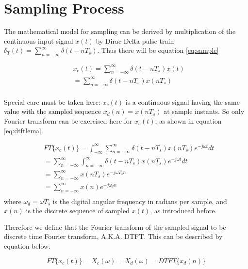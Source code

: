 \section*{Sampling Process}

The mathematical model for sampling can be derived by multiplication of the continuous 
input signal $x(t)$ by Dirac Delta pulse train $\delta_T(t) = \sum_{n=-\infty}^{\infty}\delta(t-nT_s)$.
Thus there will be equation \ref{eq:sample}

\begin{equation}
\begin{aligned}
& x_c(t)  = \sum_{n=-\infty}^{\infty}\delta (t-nT_s)x(t) \\
         & = \sum_{n=-\infty}^{\infty}\delta (t-nT_s)x(nT_s) \\
\end{aligned}
\label{eq:sample}
\end{equation}

Special care must be taken here: $x_c(t)$ is a continuous signal having the same value 
with the sampled sequence $x_d(n) = x(nT_s)$ at sample instants. So only Fourier 
transform can be exercised here for $x_c(t)$, as shown in equation \ref{eq:dtftlema}.

\begin{equation}
\begin{aligned}
& FT\{x_c(t)\}  =\int_{-\infty}^{\infty}\sum_{n=-\infty}^{\infty}\delta (t-nT_s)x(nT_s)e^{-j\omega t} dt \\
& = \sum_{n=-\infty}^{\infty}\int_{n=-\infty}^{\infty} \delta (t-nT_s)x(nT_s)e^{-j\omega t} dt \\
& = \sum_{n=-\infty}^{\infty}x(nT_s)e^{-j\omega T_s n}\\
 & = \sum_{n=-\infty}^{\infty}x(n)e^{-j\omega_d n}\\
\end{aligned}
\label{eq:dtftlema}
\end{equation}
where $\omega_d = \omega T_s$ is the digital angular frequency in radians per sample,
and $x(n)$ is the discrete sequence of sampled $x(t)$, as introduced before. 

Therefore we define that the Fourier transform of the sampled signal to be 
discrete time Fourier transform, A.K.A. DTFT. This can be described by equation below.

\begin{equation}
FT\{x_c(t)\} = X_c(\omega) = X_d(\omega) = DTFT\{x_d(n)\}
\end{equation}

